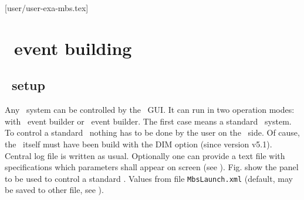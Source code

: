 [user/user-exa-mbs.tex]
\section{\mbs\ event building}
\subsection{\mbs\ setup}
Any \mbs\ system can be controlled by the \dabc\ GUI.
It can run in two operation modes: with \mbs\ event builder or \dabc\ event builder.
The first case means a standard \mbs\ system.
To control a standard \mbs\ nothing has to be done by the user on the \mbs\ side.
Of cause, the \mbs\ itself must have been build with the DIM option (since version v5.1).
Central log file is written as usual.
Optionally one can provide a text file with specifications which parameters
shall appear on screen (see ).
Fig.  show the panel to be used to control
a standard \mbs.
Values from file {\tt MbsLaunch.xml} (default, may be saved to other file,
see ).
